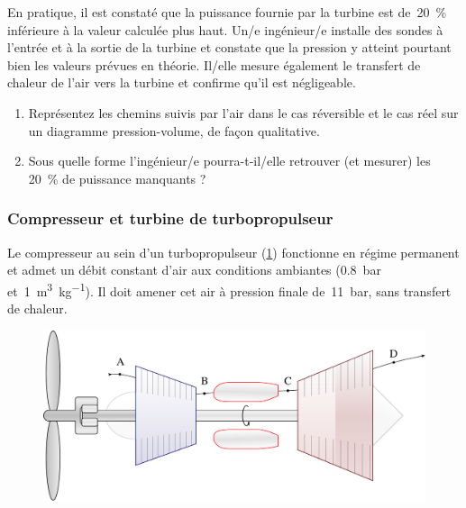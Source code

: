 	En pratique, il est constaté que la puissance fournie par la turbine est de~\SI{20}{\percent} inférieure à la valeur calculée plus haut. Un/e ingénieur/e installe des sondes à l’entrée et à la sortie de la turbine et constate que la pression y atteint pourtant bien les valeurs prévues en théorie. Il/elle mesure également le transfert de chaleur de l’air vers la turbine et confirme qu’il est négligeable.
	
	\begin{enumerate}
		\item Représentez les chemins suivis par l’air dans le cas réversible et le cas réel sur un diagramme pression-volume, de façon qualitative.
		\item Sous quelle forme l’ingénieur/e pourra-t-il/elle retrouver (et mesurer) les \SI{20}{\percent} de puissance manquants ?
	\end{enumerate}


	
\subsubsection{Compresseur et turbine de turbopropulseur}
\label{exo_compresseur_turbine_turbopropulseur}

	\wherefrom{[DS n°2 2012, 11 pts]}

	Le compresseur au sein d’un turbopropulseur (\cref{fig_turboprop}) fonctionne en régime permanent et admet un débit constant d’air aux conditions ambiantes (\SI{0,8}{\bar} et~\SI{1}{\metre\cubed\per\kilogram}). Il doit amener cet air à pression finale de~\SI{11}{\bar}, sans transfert de chaleur.
	
	\begin{figure}
		\begin{center}
			\includegraphics[width=12cm]{images/circuit_turboprop.png}
		\end{center}
		\label{fig_turboprop}
	\end{figure}


